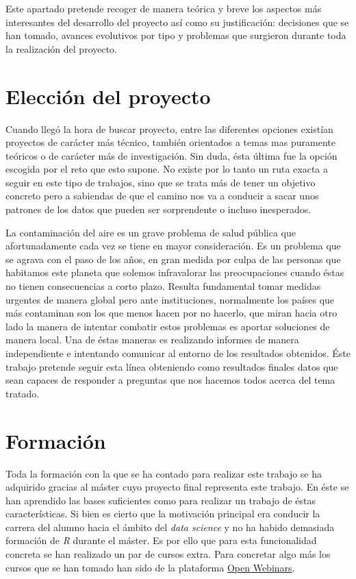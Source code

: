 
Este apartado pretende recoger de manera teórica y breve los aspectos más interesantes del desarrollo del proyecto así como su justificación: decisiones que se han tomado, avances evolutivos por tipo y problemas que surgieron durante toda la realización del proyecto.


\section{Elección del proyecto}\label{inicio-proyecto}
Cuando llegó la hora de buscar proyecto, entre las diferentes opciones existían proyectos de carácter más técnico, también orientados a temas mas puramente teóricos o de carácter más de investigación. Sin duda, ésta última fue la opción escogida por el reto que esto supone. No existe por lo tanto un ruta exacta a seguir en este tipo de trabajos, sino que se trata más de tener un objetivo concreto pero a sabiendas de que el camino nos va a conducir a sacar unos patrones de los datos que pueden ser sorprendente o incluso inesperados. 

La contaminación del aire es un grave problema de salud pública que afortunadamente cada vez se tiene en mayor consideración. Es un problema que se agrava con el paso de los años, en gran medida por culpa de las personas que habitamos este planeta que solemos infravalorar las preocupaciones cuando éstas no tienen consecuencias a corto plazo. Resulta fundamental tomar medidas urgentes de manera global pero ante instituciones, normalmente los países que más contaminan son los que menos hacen por no hacerlo, que miran hacia otro lado la manera de intentar combatir estos problemas es aportar soluciones de manera local. Una de éstas maneras es realizando informes de manera independiente e intentando comunicar al entorno de los resultados obtenidos. Éste trabajo pretende seguir esta línea obteniendo como resultados finales datos que sean capaces de responder a preguntas que nos hacemos todos acerca del tema tratado.

\section{Formación}\label{formacion}

Toda la formación con la que se ha contado para realizar este trabajo se ha adquirido gracias al máster cuyo proyecto final representa este trabajo. En éste se han aprendido las bases suficientes como para realizar un trabajo de éstas características. Si bien es cierto que la motivación principal era conducir la carrera del alumno hacia el ámbito del \textit{data science} y no ha habido demasiada formación de \textit{R} durante el máster. Es por ello que para esta funcionalidad concreta se han realizado un par de cursos extra. Para concretar algo más los cursos que se han tomado han sido de la plataforma \href{https://openwebinars.net/}{Open Webinars}.

